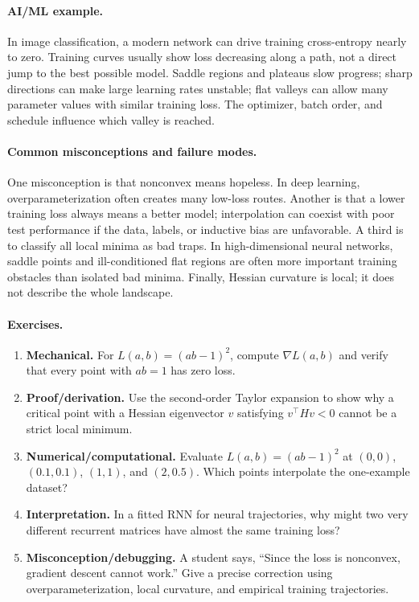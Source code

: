 \paragraph{AI/ML example.}
In image classification, a modern network can drive training cross-entropy nearly to zero. Training curves usually show loss decreasing along a path, not a direct jump to the best possible model. Saddle regions and plateaus slow progress; sharp directions can make large learning rates unstable; flat valleys can allow many parameter values with similar training loss. The optimizer, batch order, and schedule influence which valley is reached.

\paragraph{Common misconceptions and failure modes.}
One misconception is that nonconvex means hopeless. In deep learning, overparameterization often creates many low-loss routes. Another is that a lower training loss always means a better model; interpolation can coexist with poor test performance if the data, labels, or inductive bias are unfavorable. A third is to classify all local minima as bad traps. In high-dimensional neural networks, saddle points and ill-conditioned flat regions are often more important training obstacles than isolated bad minima. Finally, Hessian curvature is local; it does not describe the whole landscape.

\paragraph{Exercises.}
\begin{enumerate}[label=\textbf{39.1.\arabic*.}, leftmargin=*]
\item \textbf{Mechanical.} For \(L(a,b)=(ab-1)^2\), compute \(\nabla L(a,b)\) and verify that every point with \(ab=1\) has zero loss.
\item \textbf{Proof/derivation.} Use the second-order Taylor expansion to show why a critical point with a Hessian eigenvector \(v\) satisfying \(v^\top H v<0\) cannot be a strict local minimum.
\item \textbf{Numerical/computational.} Evaluate \(L(a,b)=(ab-1)^2\) at \((0,0)\), \((0.1,0.1)\), \((1,1)\), and \((2,0.5)\). Which points interpolate the one-example dataset?
\item \textbf{Interpretation.} In a fitted RNN for neural trajectories, why might two very different recurrent matrices have almost the same training loss?
\item \textbf{Misconception/debugging.} A student says, ``Since the loss is nonconvex, gradient descent cannot work.'' Give a precise correction using overparameterization, local curvature, and empirical training trajectories.
\end{enumerate}


